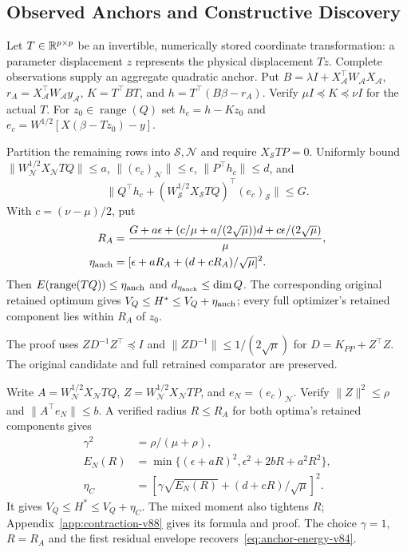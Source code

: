 \subsection{Observed Anchors and Constructive Discovery}\label{sec:anchored-energy-v84}
Let $T\in\mathbb R^{p\times p}$ be an invertible, numerically stored coordinate transformation: a parameter displacement $z$ represents the physical displacement $Tz$. Complete observations supply an aggregate quadratic anchor. Put $B=\lambda I+X_{\mathcal A}^\top W_{\mathcal A}X_{\mathcal A}$, $r_A=X_{\mathcal A}^\top W_{\mathcal A}y_{\mathcal A}$, $K=T^\top BT$, and $h=T^\top(B\beta-r_A)$. Verify $\mu I\preceq K\preceq\nu I$ for the actual $T$. For $z_0\in\operatorname{range}(Q)$ set $h_c=h-Kz_0$ and $e_c=W^{1/2}[X(\beta-Tz_0)-y]$.

\begin{corollary}\label{cor:anchor-energy-v84}
Partition the remaining rows into $\mathcal S,\mathcal N$ and require $X_{\mathcal S}TP=0$. Uniformly bound $\|W_{\mathcal N}^{1/2}X_{\mathcal N}TQ\|\le a$, $\|(e_c)_{\mathcal N}\|\le\epsilon$, $\|P^\top h_c\|\le d$, and
\[
 \|Q^\top h_c+(W_{\mathcal S}^{1/2}X_{\mathcal S}TQ)^\top(e_c)_{\mathcal S}\|\le G.
\]
With $c=(\nu-\mu)/2$, put
\begin{align}
 R_A&=\frac{G+a\epsilon+(c/\mu+a/(2\sqrt\mu))d+c\epsilon/(2\sqrt\mu)}{\mu},\nonumber\\
 \eta_{\rm anch}&=[\epsilon+aR_A+(d+cR_A)/\sqrt\mu]^2.\label{eq:anchor-energy-v84}
\end{align}
Then $E(\operatorname{range}(TQ))\le\eta_{\rm anch}$ and $d_{\eta_{\rm anch}}\le\dim Q$. The corresponding original retained optimum gives $V_Q\le H^*\le V_Q+\eta_{\rm anch}$; every full optimizer's retained component lies within $R_A$ of $z_0$.
\end{corollary}
The proof uses $ZD^{-1}Z^\top\preceq I$ and $\|ZD^{-1}\|\le1/(2\sqrt\mu)$ for $D=K_{PP}+Z^\top Z$. The original candidate and full retrained comparator are preserved.

Write $A=W_{\mathcal N}^{1/2}X_{\mathcal N}TQ$, $Z=W_{\mathcal N}^{1/2}X_{\mathcal N}TP$, and $e_N=(e_c)_{\mathcal N}$. Verify $\|Z\|^2\le\rho$ and $\|A^\top e_N\|\le b$. A verified radius $R\le R_A$ for both optima's retained components gives
\begin{align}
 \gamma^2&=\rho/(\mu+\rho),\nonumber\\
 E_N(R)&=\min\{(\epsilon+aR)^2,\epsilon^2+2bR+a^2R^2\},\nonumber\\
 \eta_C&=\left[\gamma\sqrt{E_N(R)}+(d+cR)/\sqrt\mu\right]^2.\label{eq:contraction-main-v89}
\end{align}
It gives $V_Q\le H^*\le V_Q+\eta_C$. The mixed moment also tightens $R$; Appendix~\ref{app:contraction-v88} gives its formula and proof. The choice $\gamma=1$, $R=R_A$ and the first residual envelope recovers~\eqref{eq:anchor-energy-v84}.

